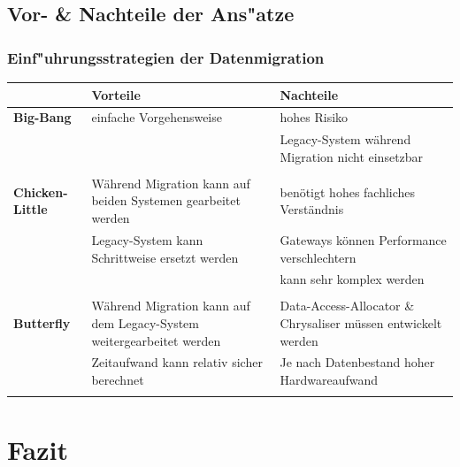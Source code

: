 \documentclass{beamer}
\begin{document}
	\subsection{Vor- \& Nachteile der Ans"atze}
	\begin{frame}
		\frametitle{Einf"uhrungsstrategien der Datenmigration}
		
                \begin{footnotesize}
                \begin{table}[h]
                \centering
                \begin{tabular}{|p{1.5cm}|p{4.25cm}|p{4.25cm}|}
               
                \hline
                & \textbf{Vorteile} & \textbf{Nachteile} \\ 
		\hline
		\textbf{Big-Bang} & einfache Vorgehensweise & hohes Risiko \\
		\cline{3-3}
		& & Legacy-System während Migration nicht einsetzbar \\
		& & \\
		\hline
		
		\textbf{Chicken-Little} & Während Migration kann auf beiden Systemen gearbeitet werden & benötigt hohes fachliches Verständnis \\
		\cline{2-3}
		& Legacy-System kann Schrittweise ersetzt werden & Gateways können Performance verschlechtern \\
		\cline{3-3}
		& & kann sehr komplex werden \\
		& & \\
		\hline
		
		\textbf{Butterfly} & Während Migration kann auf dem Legacy-System weitergearbeitet werden & Data-Access-Allocator \& Chrysaliser müssen entwickelt werden \\
		\cline{2-3}
		& Zeitaufwand kann relativ sicher berechnet & Je nach Datenbestand hoher Hardwareaufwand \\
		& & \\
		\hline
		
		
		\end{tabular}
		\end{table}
		\end{footnotesize}
	
	\end{frame}
	
	
	\section{Fazit}
	
\end{document}
